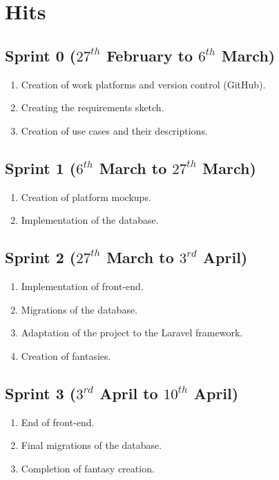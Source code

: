 \section{Hits} %
\subsection{Sprint 0 ($27^{th}$ February to $6^{th}$ March)}
\begin{enumerate}
	\item Creation of work platforms and version control (GitHub).
	\item Creating the requirements sketch.
	\item Creation of use cases and their descriptions.
\end{enumerate}
\subsection{Sprint 1 ($6^{th}$ March to $27^{th}$ March)}
\begin{enumerate}
	\item Creation of platform mockups.
	\item Implementation of the database.
\end{enumerate}

\subsection{Sprint 2 ($27^{th}$ March to $3^{rd}$ April)}
\begin{enumerate}
	\item Implementation of front-end.
	\item Migrations of the database.
	\item Adaptation of the project to the Laravel framework.
	\item Creation of fantasies.
\end{enumerate}

\subsection{Sprint 3 ($3^{rd}$ April to $10^{th}$ April)}
\begin{enumerate}
	\item End of front-end.
	\item Final migrations of the database.
	\item Completion of fantasy creation.
\end{enumerate}


